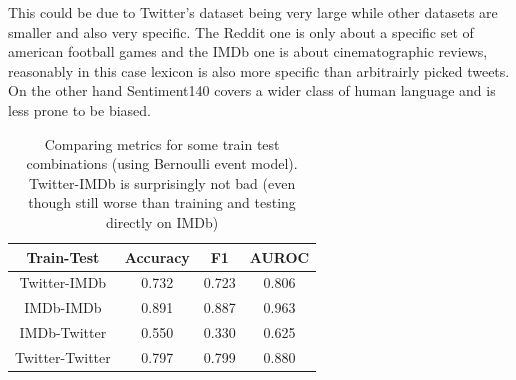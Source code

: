 This could be due to Twitter's dataset being very large while other datasets are smaller and also very specific.
The Reddit one is only about a specific set of american football games and the IMDb one is about cinematographic reviews, reasonably in this case lexicon is also more specific than arbitrairly picked tweets.
On the other hand Sentiment140 covers a wider class of human language and is less prone to be biased.


\begin{table}[h!t]
    \centering
    \caption{Comparing metrics for some train test combinations (using Bernoulli event model). Twitter-IMDb is surprisingly not bad (even though still worse than training and testing directly on IMDb)}
    \label{tab:versus_metrics}
    \begin{tabular}{c|ccc}
        \hline
        Train-Test & Accuracy & F1 & AUROC \\
        \hline 
        Twitter-IMDb & 0.732 & 0.723 & 0.806 \\ 
        IMDb-IMDb & 0.891 & 0.887 & 0.963 \\ 
        IMDb-Twitter & 0.550 & 0.330 & 0.625 \\ 
        Twitter-Twitter & 0.797 & 0.799 & 0.880 \\ 
        \hline
    \end{tabular}
\end{table}

